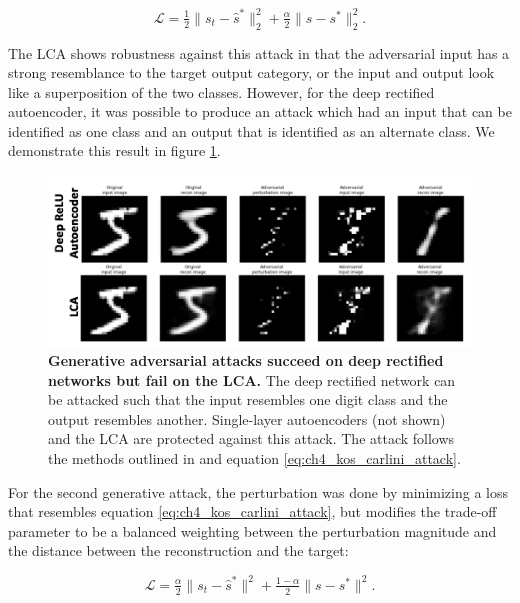 \begin{equation}\label{eq:ch4_kos_carlini_attack}
    \mathcal{L} = \tfrac{1}{2} \|s_{t} - \hat{s}^{*}\|_{2}^{2} + \tfrac{\alpha}{2}\|s - s^{*}\|_{2}^{2}.
\end{equation}

The LCA shows robustness against this attack in that the adversarial input has a strong resemblance to the target output category, or the input and output look like a superposition of the two classes. However, for the deep rectified autoencoder, it was possible to produce an attack which had an input that can be identified as one class and an output that is identified as an alternate class. We demonstrate this result in figure \ref{fig:ch4_carlini_deep_relu_lca}.

\begin{figure}[h]
    \centering
    \includegraphics[width=\textwidth]{figures/adv_carlini_deep_relu_lca.png}
    \caption{\textbf{Generative adversarial attacks succeed on deep rectified networks but fail on the LCA.} The deep rectified network can be attacked such that the input resembles one digit class and the output resembles another. Single-layer autoencoders (not shown) and the LCA are protected against this attack. The attack follows the methods outlined in \parencite{kos2018adversarial} and equation \eqref{eq:ch4_kos_carlini_attack}.}
    \label{fig:ch4_carlini_deep_relu_lca}
\end{figure}

For the second generative attack, the perturbation was done by minimizing a loss that resembles equation \eqref{eq:ch4_kos_carlini_attack}, but modifies the trade-off parameter to be a balanced weighting between the perturbation magnitude and the distance between the reconstruction and the target:

\begin{equation}\label{eq:ch4_carlini_targeted_recon}
    \mathcal{L} = \tfrac{\alpha}{2} \|s_{t} - \hat{s}^{*}\|^{2} + \tfrac{1-\alpha}{2}\|s - s^{*}\|^{2}.
\end{equation}

